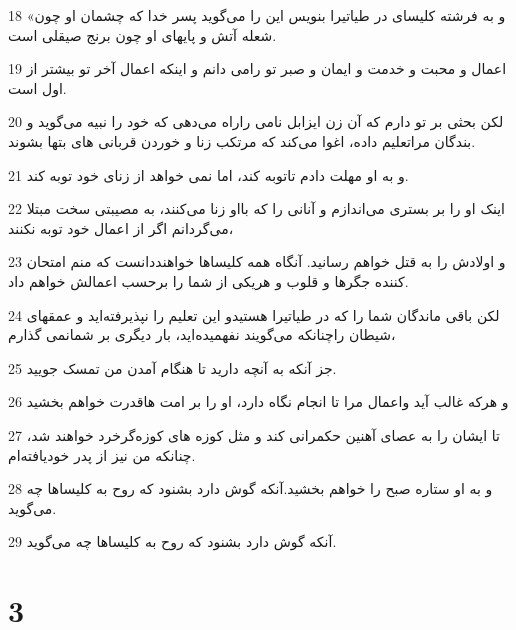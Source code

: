 \par 18 «و به فرشته کلیسای در طیاتیرا بنویس این را می‌گوید پسر خدا که چشمان او چون شعله آتش و پایهای او چون برنج صیقلی است.
\par 19 اعمال و محبت و خدمت و ایمان و صبر تو رامی دانم و اینکه اعمال آخر تو بیشتر از اول است.
\par 20 لکن بحثی بر تو دارم که آن زن ایزابل نامی راراه می‌دهی که خود را نبیه می‌گوید و بندگان مراتعلیم داده، اغوا می‌کند که مرتکب زنا و خوردن قربانی های بتها بشوند.
\par 21 و به او مهلت دادم تاتوبه کند، اما نمی خواهد از زنای خود توبه کند.
\par 22 اینک او را بر بستری می‌اندازم و آنانی را که بااو زنا می‌کنند، به مصیبتی سخت مبتلا می‌گردانم اگر از اعمال خود توبه نکنند،
\par 23 و اولادش را به قتل خواهم رسانید. آنگاه همه کلیساها خواهنددانست که منم امتحان کننده جگرها و قلوب و هریکی از شما را برحسب اعمالش خواهم داد.
\par 24 لکن باقی ماندگان شما را که در طیاتیرا هستیدو این تعلیم را نپذیرفته‌اید و عمقهای شیطان راچنانکه می‌گویند نفهمیده‌اید، بار دیگری بر شمانمی گذارم،
\par 25 جز آنکه به آنچه دارید تا هنگام آمدن من تمسک جویید.
\par 26 و هر‌که غالب آید واعمال مرا تا انجام نگاه دارد، او را بر امت هاقدرت خواهم بخشید
\par 27 تا ایشان را به عصای آهنین حکمرانی کند و مثل کوزه های کوزه‌گرخرد خواهند شد، چنانکه من نیز از پدر خودیافته‌ام.
\par 28 و به او ستاره صبح را خواهم بخشید.آنکه گوش دارد بشنود که روح به کلیساها چه می‌گوید.
\par 29 آنکه گوش دارد بشنود که روح به کلیساها چه می‌گوید.

\chapter{3}

